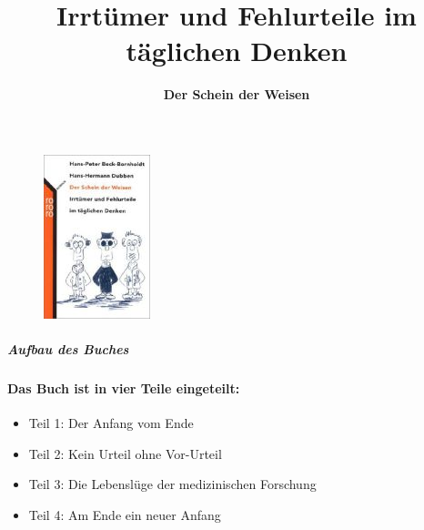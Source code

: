 \documentclass{article}
\begin{document}
\maketitle
\begin{center}
\subtitle{\bfseries \Huge Der Schein der Weisen} \newline
\title{\Large Irrt\"{u}mer und Fehlurteile im t\"{a}glichen Denken}\newline  

\end{center}

\begin{figure}[htbp]
	\centering
		\includegraphics{Cover.jpg}
	\label{fig:Cover}
\end{figure}
\newpage



\begin{center}
\subparagraph{\LARGE Aufbau des Buches}
\newline
\newline
\paragraph{Das Buch ist in vier Teile eingeteilt:}
\begin{itemize}
	\item Teil 1: Der Anfang vom Ende
	\item Teil 2: Kein Urteil ohne Vor-Urteil
	\item Teil 3: Die Lebensl\"{u}ge der medizinischen Forschung
	\item Teil 4: Am Ende ein neuer Anfang
\end{itemize}
\end{center}


\end{document}
